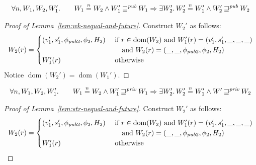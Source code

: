 \documentclass[a4paper]{article}
\newcommand{\nequal}[1][n]{\stackrel{\tiny{#1}}{=}}
\DeclareMathOperator{\dom}{dom}
\newcommand{\var}[1]{\mathit{#1}}
\newcommand{\pub}{\var{pub}}
\newcommand{\futurewk}{\mathbin{\sqsupseteq}^{\var{pub}}}
\newcommand{\futurestr}{\mathbin{\sqsupseteq}^{\var{priv}}}
\begin{document}
\begin{lemma}
  \label{lem:wk-nequal-and-future}
  \begin{align*}
    &\forall n,W_1,W_2,W_1' \ldotp
    &\quad W_1 \nequal W_2 \land W_1' \futurewk W_1 \Rightarrow \exists W_2' \ldotp W_2' \nequal W_1' \land W_2' \futurewk W_2
  \end{align*}
\end{lemma}
\begin{proof}[Proof of Lemma~\ref{lem:wk-nequal-and-future}]
  Construct $W_2'$ as follows:
  \[
    W_2(r) =
    \begin{cases}
      (v_1',s_1',\phi_{\pub2},\phi_2,H_2) & \arraycolsep=0pt
      \begin{array}[t]{l}
        \text{ if $r \in \dom(W_2)$ and $W_1'(r) = (v_1',s_1',\_,\_,\_)$}\\
        \quad \text{ and $W_2(r) = (\_,\_,\phi_{\pub2},\phi_2,H_2)$}\\
      \end{array} \\
      W_1'(r) & \text{ otherwise}
    \end{cases}
  \]
  Notice $\dom(W_2') = \dom(W_1')$.
\end{proof}

\begin{lemma}
  \label{lem:str-nequal-and-future}
  \begin{align*}
    &\forall n,W_1,W_2,W_1' \ldotp
    &\quad W_1 \nequal W_2 \land W_1' \futurestr W_1 \Rightarrow \exists W_2' \ldotp W_2' \nequal W_1' \land W' \futurestr W_2
  \end{align*}
\end{lemma}
\begin{proof}[Proof of Lemma~\ref{lem:str-nequal-and-future}]
  Construct $W_2'$ as follows:
  \[
    W_2(r) =
    \begin{cases}
      (v_1',s_1',\phi_{\pub2},\phi_2,H_2) & \arraycolsep=0pt
      \begin{array}[t]{l}
        \text{ if $r \in \dom(W_2)$ and $W_1'(r) = (v_1',s_1',\_,\_,\_)$}\\
        \quad \text{ and $W_2(r) = (\_,\_,\phi_{\pub2},\phi_2,H_2)$}\\
      \end{array} \\
      W_1'(r) & \text{ otherwise}
    \end{cases}
  \]

\end{proof}
\end{document}
